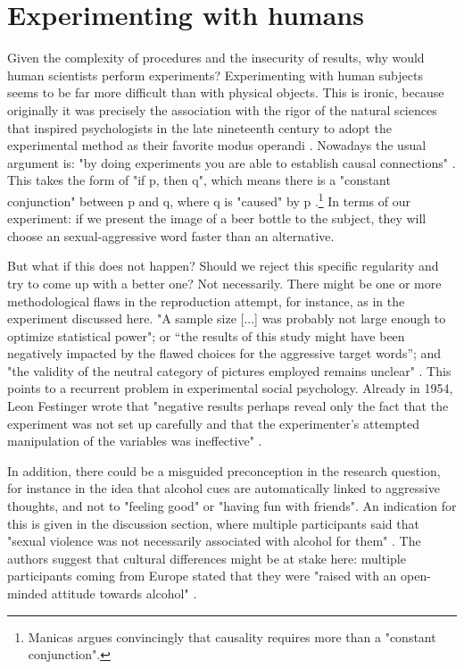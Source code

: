 \documentclass[twocolumn, serif, authordate, reflection]{jote-article}
\begin{document}
{}
\section*{Experimenting with humans}



Given the complexity of procedures and the insecurity of results, why would human scientists perform experiments? Experimenting with human subjects seems to be far more difficult than with physical objects. This is ironic, because originally it was precisely the association with the rigor of the natural sciences that inspired psychologists in the late nineteenth century to adopt the experimental method as their favorite modus operandi \parencite{Danziger1990}. Nowadays the usual argument is: "by doing experiments you are able to establish causal connections" . This takes the form of "if p, then q", which means there is a "constant conjunction" between p and q, where q is "caused" by p \parencite{Manicas2006}.\footnote{Manicas argues convincingly that causality requires more than a "constant conjunction". } In terms of our experiment: if we present the image of a beer bottle to the subject, they will choose an sexual-aggressive word faster than an alternative. 

But what if this does not happen? Should we reject this specific regularity and try to come up with a better one? Not necessarily. There might be one or more methodological flaws in the reproduction attempt, for instance, as in the experiment discussed here. "A sample size [...] was probably not large enough to optimize statistical power"; or “the results of this study might have been negatively impacted by the flawed choices for the aggressive target words”; and "the validity of the neutral category of pictures employed remains unclear" \parencite[pp. 13-16]{Leboeuf2020}. This points to a recurrent problem in experimental social psychology. Already in 1954, Leon Festinger wrote that "negative results perhaps reveal only the fact that the experiment was not set up carefully and that the experimenter’s attempted manipulation of the variables was ineffective"  \parencite[p. 143]{Festinger1954}.

In addition, there could be a misguided preconception in the research question, for instance in the idea that alcohol cues are automatically linked to aggressive thoughts, and not to "feeling good" or "having fun with friends". An indication for this is given in the discussion section, where multiple participants said that "sexual violence was not necessarily associated with alcohol for them"  \parencite[p. 15]{Leboeuf2020}. The authors suggest that cultural differences might be at stake here: multiple participants coming from Europe stated that they were "raised with an open-minded attitude towards alcohol"  \parencite[p. 15]{Leboeuf2020}. 
\end{document}
